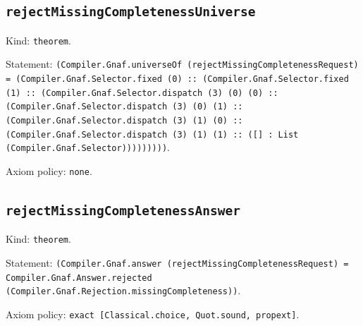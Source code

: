 \documentclass[11pt]{article}
\begin{document}
\subsection*{\texttt{rejectMissingCompletenessUniverse}}
\noindent Kind: \texttt{theorem}.\par
\noindent Statement: \texttt{(Compiler.Gnaf.universeOf (rejectMissingCompletenessRequest) = (Compiler.Gnaf.Selector.fixed (0) :: (Compiler.Gnaf.Selector.fixed (1) :: (Compiler.Gnaf.Selector.dispatch (3) (0) (0) :: (Compiler.Gnaf.Selector.dispatch (3) (0) (1) :: (Compiler.Gnaf.Selector.dispatch (3) (1) (0) :: (Compiler.Gnaf.Selector.dispatch (3) (1) (1) :: ([] : List (Compiler.Gnaf.Selector)))))))))}.\par
\noindent Axiom policy: \texttt{none}.\par
\subsection*{\texttt{rejectMissingCompletenessAnswer}}
\noindent Kind: \texttt{theorem}.\par
\noindent Statement: \texttt{(Compiler.Gnaf.answer (rejectMissingCompletenessRequest) = Compiler.Gnaf.Answer.rejected (Compiler.Gnaf.Rejection.missingCompleteness))}.\par
\noindent Axiom policy: \texttt{exact [Classical.choice, Quot.sound, propext]}.\par
\end{document}

